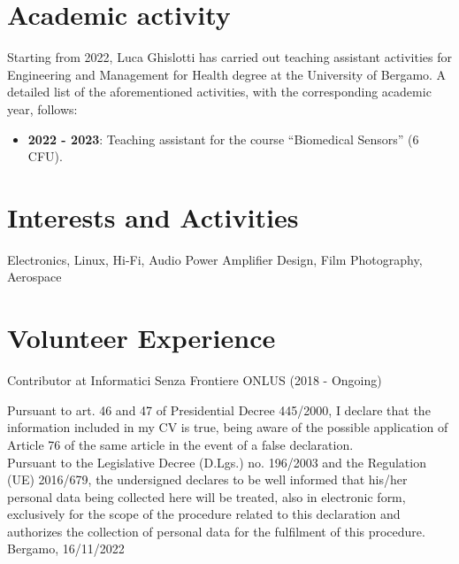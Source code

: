 \documentclass[11pt]{article}
\begin{document}
\bigskip
\section*{Academic activity}
Starting from 2022, Luca Ghislotti has carried out teaching assistant activities for Engineering and Management for Health degree at the University of Bergamo. A detailed list of the aforementioned activities, with the corresponding academic year, follows:\\

\vspace{-0.5em}
\begin{itemize}
	\item \textbf{2022 - 2023}: Teaching assistant for the course “Biomedical Sensors” (6 CFU).
\end{itemize}


\bigskip
\section*{Interests and Activities}
Electronics, Linux, Hi-Fi,  Audio Power Amplifier Design, Film Photography, Aerospace

\bigskip
\section*{Volunteer Experience}
Contributor at Informatici Senza Frontiere ONLUS (2018 - Ongoing)

\vspace{2cm}
\noindent
Pursuant to art. 46 and 47 of Presidential Decree 445/2000, I declare that the information included in my CV is true, being aware of the possible application of Article 76 of the same article in the event of a false declaration.\\
Pursuant to the Legislative Decree (D.Lgs.) no. 196/2003 and the Regulation (UE) 2016/679, the undersigned declares to be well informed that his/her personal data being collected here will be treated, also in electronic form, exclusively for the scope of the procedure related to this declaration and authorizes the collection of personal data for the fulfilment of this procedure.\\

\bigskip
Bergamo, 16/11/2022
\vspace{1cm}
\end{document}
